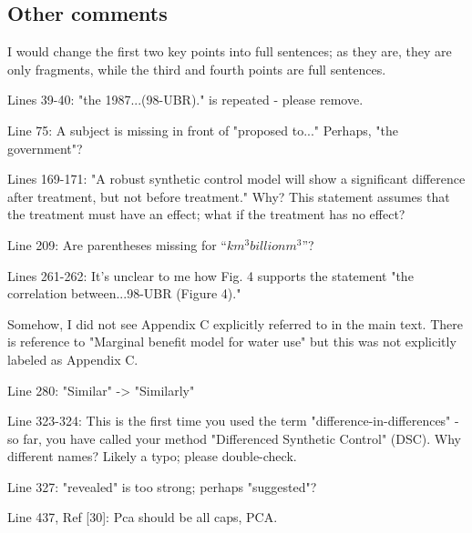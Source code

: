 \subsection{Other comments}\label{sec:1-3}
\RC{} I would change the first two key points into full sentences; as they are, they are only fragments, while the third and fourth points are full sentences.

\RC{} Lines 39-40: "the 1987...(98-UBR)." is repeated - please remove.

\RC{} Line 75: A subject is missing in front of "proposed to..." Perhaps, "the government"?

\RC{} Lines 169-171: "A robust synthetic control model will show a significant difference after treatment, but not before treatment." Why? This statement assumes that the treatment must have an effect; what if the treatment has no effect?

\RC{} Line 209: Are parentheses missing for ``$km^3 billion m^3$''?

\RC{} Lines 261-262: It's unclear to me how Fig. 4 supports the statement "the correlation between...98-UBR (Figure 4)."

\RC{} Somehow, I did not see Appendix C explicitly referred to in the main text. There is reference to "Marginal benefit model for water use" but this was not explicitly labeled as Appendix C.

\RC{} Line 280: "Similar" -> "Similarly"

\RC{} Line 323-324: This is the first time you used the term "difference-in-differences" - so far, you have called your method "Differenced Synthetic Control" (DSC). Why different names? Likely a typo; please double-check.

\RC{} Line 327: "revealed" is too strong; perhaps "suggested"?

\RC{} Line 437, Ref [30]: Pca should be all caps, PCA.\

